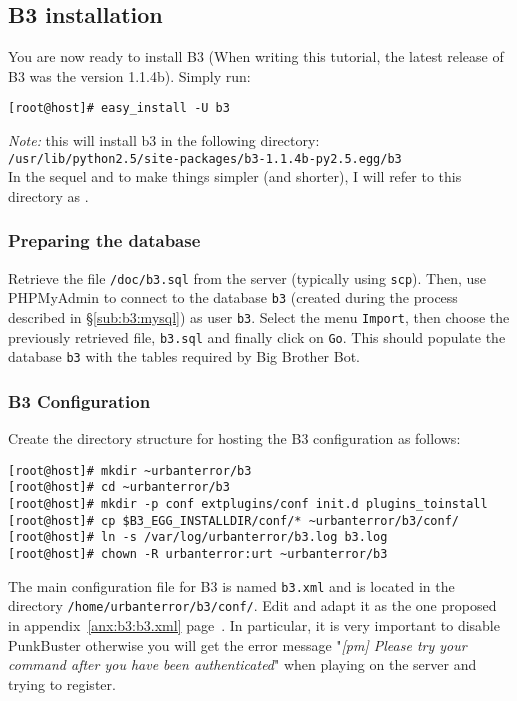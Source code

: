 \subsection{B3 installation}
\label{sec:b3:install}

You are now ready to install B3 (When writing this tutorial, the latest release
of B3 was the version 1.1.4b). 
Simply run:
\begin{lstlisting}[style=command]
[root@host]# easy_install -U b3
\end{lstlisting}
\emph{Note:} this will install b3 in the following directory: \\
\texttt{/usr/lib/python2.5/site-packages/b3-1.1.4b-py2.5.egg/b3} \\
In the sequel and to make things simpler (and shorter), I will refer to this
directory as \begginstall.

\subsubsection{Preparing the database}
\label{sec:b3:dbsetup}

Retrieve the file \begginstall\texttt{/doc/b3.sql} from the server (typically
using \texttt{scp}). 
Then, use PHPMyAdmin to connect to the database \texttt{b3} (created during the process
described in \S\ref{sub:b3:mysql}) as user \texttt{b3}.
Select the menu \texttt{Import}, then choose the previously retrieved file,
\texttt{b3.sql} and finally click on \texttt{Go}. 
This should populate the database \texttt{b3} with the tables required by Big
Brother Bot.  

\subsubsection{B3 Configuration}
\label{sec:b3:config}

Create the directory structure for hosting the B3 configuration as follows: 
\begin{lstlisting}[style=command]
[root@host]# mkdir ~urbanterror/b3
[root@host]# cd ~urbanterror/b3
[root@host]# mkdir -p conf extplugins/conf init.d plugins_toinstall
[root@host]# cp $B3_EGG_INSTALLDIR/conf/* ~urbanterror/b3/conf/
[root@host]# ln -s /var/log/urbanterror/b3.log b3.log
[root@host]# chown -R urbanterror:urt ~urbanterror/b3
\end{lstlisting}%

The main configuration file for B3 is named \texttt{b3.xml} and is located in
the directory \texttt{/home/urbanterror/b3/conf/}. 
Edit and adapt it as the one proposed in appendix~\ref{anx:b3:b3.xml}
page~\pageref{anx:b3:b3.xml}. 
In particular, it is very important to disable PunkBuster otherwise you will get
the error message "\emph{[pm] Please try your command after you have been
  authenticated}" when playing on the server and trying to register.


